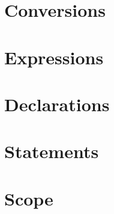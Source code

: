 \documentclass{article}
\begin{document}
\section{Conversions}

\section{Expressions}

\section{Declarations}


\section{Statements}

\section{Scope}
\end{document}
